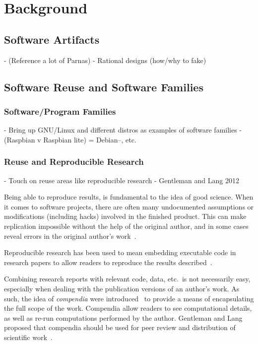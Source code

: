 \chapter{Background}
\section{Software Artifacts}
\label{sec:sfs}
 -  (Reference a lot of Parnas)
 - Rational designs (how/why to fake)
\section{Software Reuse and Software Families}
\subsection{Software/Program Families}
  - Bring up GNU/Linux and different distros as examples of software families
    - (Raspbian v Raspbian lite) = Debian--, etc.
\subsection{Reuse and Reproducible Research}
  - Touch on reuse areas like reproducible research - Gentleman and Lang 2012

Being able to reproduce results, is fundamental to the idea of good science.
When it comes to software projects, there are often many undocumented
assumptions or modifications (including hacks) involved in the finished product.
This can make replication impossible without the help of the original author,
and in some cases reveal errors in the original author's
work~\cite{IonescuAndJansson2013}.

Reproducible research has been used to mean embedding executable code in
research papers to allow readers to reproduce the results
described~\cite{SchulteEtAl2012}.

Combining research reports with relevant code, data, etc.\ is not necessarily
easy, especially when dealing with the publication versions of an author's work.
As such, the idea of \emph{compendia} were
introduced~\cite{GentlemanAndLang2012} to provide a means of encapsulating the
full scope of the work. Compendia allow readers to see computational details, as
well as re-run computations performed by the author. Gentleman and Lang proposed
that compendia should be used for peer review and distribution of scientific
work~\cite{GentlemanAndLang2012}.

